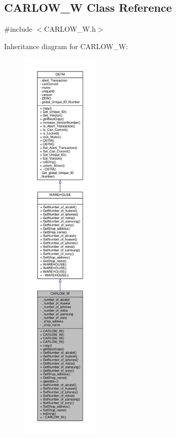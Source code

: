 \hypertarget{class_c_a_r_l_o_w___w}{}\subsection{C\+A\+R\+L\+O\+W\+\_\+W Class Reference}
\label{class_c_a_r_l_o_w___w}


{\ttfamily \#include $<$C\+A\+R\+L\+O\+W\+\_\+\+W.\+h$>$}



Inheritance diagram for C\+A\+R\+L\+O\+W\+\_\+W\+:\nopagebreak
\begin{figure}[H]
\begin{center}
\leavevmode
\includegraphics[height=550pt]{class_c_a_r_l_o_w___w__inherit__graph}
\end{center}
\end{figure}


